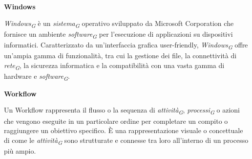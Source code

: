 \documentclass{article}
\begin{document}
\vspace{0.4cm}

\textbf{Windows}

\vspace{0.1cm}

\textit{Windows}\textsubscript{\textit{G}} è un \textit{sistema}\textsubscript{\textit{G}} operativo sviluppato da Microsoft Corporation che fornisce un ambiente \textit{software}\textsubscript{\textit{G}} per l'esecuzione di applicazioni su dispositivi informatici. Caratterizzato da un'interfaccia grafica user-friendly, \textit{Windows}\textsubscript{\textit{G}} offre un'ampia gamma di funzionalità, tra cui la gestione dei file, la connettività di \textit{rete}\textsubscript{\textit{G}}, la sicurezza informatica e la compatibilità con una vasta gamma di hardware e \textit{software}\textsubscript{\textit{G}}.

\vspace{0.4cm}

\textbf{Workflow}

\vspace{0.1cm}

Un Workflow rappresenta il flusso o la sequenza di \textit{attività}\textsubscript{\textit{G}}, \textit{processi}\textsubscript{\textit{G}} o azioni che vengono eseguite in un particolare ordine per completare un compito o raggiungere un obiettivo specifico. È una rappresentazione visuale o concettuale di come le \textit{attività}\textsubscript{\textit{G}} sono strutturate e connesse tra loro all'interno di un processo più ampio.
\end{document}
